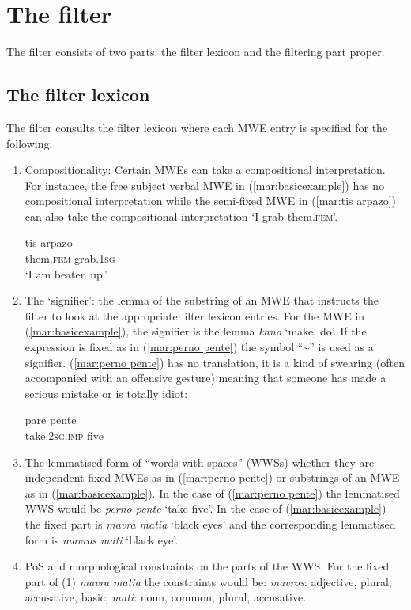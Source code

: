 \documentclass[output=paper]{langsci/langscibook}
\begin{document}
\section{The filter}
Τhe filter consists of two parts: the filter lexicon and the filtering part proper. 

\subsection{The filter lexicon}
The filter consults the filter lexicon where each MWE entry is specified for the following:

\begin{enumerate}
\item Compositionality: Certain MWEs can take a compositional interpretation. For instance, the free subject verbal MWE in (\ref{mar:basicexample}) has no compositional interpretation while the semi-fixed MWE in (\ref{mar:tis arpazo}) can also take the compositional interpretation `I grab them.\textsc{fem}’. 

\ea\label{mar:tis arpazo}
\gll tis                  arpazo\\
them.\textsc{fem} grab.\textsc{1sg}\\
\glt `I am beaten up.’
\z

\item The ‘signifier’: the lemma of the substring of an MWE that instructs the filter to look at the appropriate filter lexicon entries. For the MWE in (\ref{mar:basicexample}), the signifier is the lemma \textit{kano} `make, do'. If the expression is fixed as in (\ref{mar:perno pente}) the symbol ``\textasciitilde{}'' is used as a signifier.  (\ref{mar:perno pente}) has no translation, it is a kind of swearing (often accompanied with an offensive gesture) meaning that someone has made a serious mistake or is totally idiot:
  
 \ea\label{mar:perno pente}
\gll pare pente\\
take.\textsc{2sg}.\textsc{imp} five\\ 
\z

\item The lemmatised form of  ``words with spaces'' (WWSs) whether they are independent fixed MWEs as in (\ref{mar:perno pente}) or substrings of an MWE as in (\ref{mar:basicexample}). In the case of (\ref{mar:perno pente}) the lemmatised WWS would be \textit{perno pente} `take five'. In the case of (\ref{mar:basicexample}) the fixed part is \textit{mavra matia} `black eyes' and the corresponding lemmatised form is \textit{mavros mati} `black eye'.\\

\item PoS and morphological constraints on the parts of the WWS. For the fixed part of (1) \textit{mavra matia} the constraints would be: \textit{mavros}: adjective, plural, accusative, basic; \textit{mati}: noun, common, plural, accusative. 
\end{enumerate}
\end{document}
